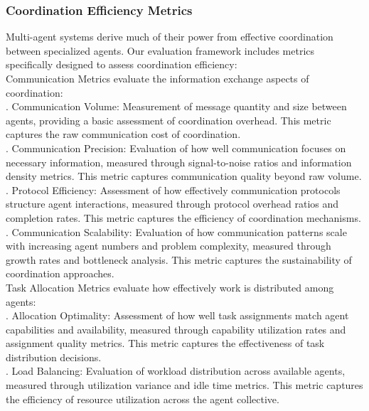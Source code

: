 \subsubsection{Coordination Efficiency Metrics}
Multi-agent systems derive much of their power from effective coordination between specialized agents. Our evaluation framework includes metrics specifically designed to assess coordination efficiency:\\ \newline
Communication Metrics evaluate the information exchange aspects of coordination:\\ . Communication Volume: Measurement of message quantity and size between agents, providing a basic assessment of coordination overhead. This metric captures the raw communication cost of coordination.\\ . Communication Precision: Evaluation of how well communication focuses on necessary information, measured through signal-to-noise ratios and information density metrics. This metric captures communication quality beyond raw volume.\\ . Protocol Efficiency: Assessment of how effectively communication protocols structure agent interactions, measured through protocol overhead ratios and completion rates. This metric captures the efficiency of coordination mechanisms.\\ . Communication Scalability: Evaluation of how communication patterns scale with increasing agent numbers and problem complexity, measured through growth rates and bottleneck analysis. This metric captures the sustainability of coordination approaches.\\ \newline
Task Allocation Metrics evaluate how effectively work is distributed among agents:\\ . Allocation Optimality: Assessment of how well task assignments match agent capabilities and availability, measured through capability utilization rates and assignment quality metrics. This metric captures the effectiveness of task distribution decisions.\\ . Load Balancing: Evaluation of workload distribution across available agents, measured through utilization variance and idle time metrics. This metric captures the efficiency of resource utilization across the agent collective.\\ \newline
